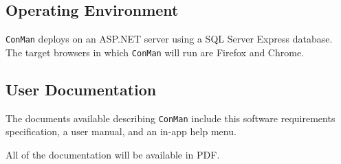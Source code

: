 \documentclass{article}
\begin{document}
\subsection{Operating Environment}
\texttt{ConMan} deploys on an ASP.NET server using a SQL Server Express database.
The target browsers in which \texttt{ConMan} will run are Firefox and Chrome.



\subsection{User Documentation}
The documents available describing \texttt{ConMan} include this software requirements specification, a 
user manual, and
an in-app help menu.

All of the documentation will be available in PDF.

\end{document}
